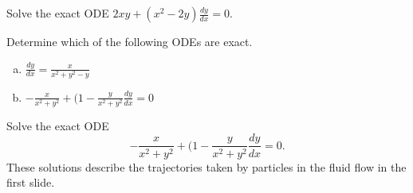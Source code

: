 \begin{applicationActivities}
\begin{activity}{10}
Solve the exact ODE \(2xy+(x^2-2y) \frac{dy}{dx}=0\).
\end{activity}

\begin{activity}{10}
Determine which of the following ODEs are exact.
\begin{enumerate}[(a)]
\item \(\frac{dy}{dx}= \frac{x}{x^2+y^2-y}\)
\item \( -\frac{x}{x^2+y^2} +(1-\frac{y}{x^2+y^2}\frac{dy}{dx} = 0\)
\end{enumerate}
\end{activity}

\begin{activity}{10}
Solve the exact ODE 
\[ -\frac{x}{x^2+y^2} +(1-\frac{y}{x^2+y^2}\frac{dy}{dx} = 0.\]
These solutions describe the trajectories taken by particles in the fluid flow in the first slide.
\end{activity}



\end{applicationActivities}

